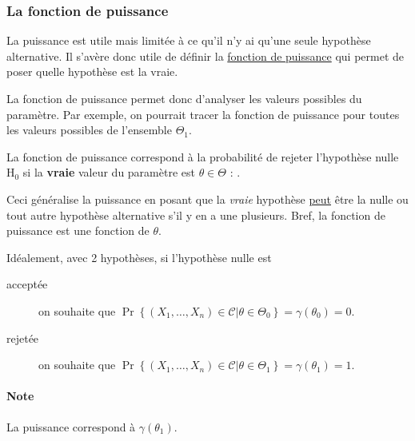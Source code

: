 \documentclass[french]{article}
\begin{document}
\begin{multicols*}{2}
\subsubsection{La fonction de puissance}
\begin{rappel_enhanced}[Contexte]
La puissance est utile mais limitée à ce qu'il n'y ai qu'une seule hypothèse alternative. Il s'avère donc utile de définir la \underline{fonction de puissance} qui permet de poser quelle hypothèse est la vraie.

\bigskip

La fonction de puissance permet donc d'analyser les valeurs possibles du paramètre. Par exemple, on pourrait tracer la fonction de puissance pour toutes les valeurs possibles de l'ensemble $\Theta_{1}$.
\end{rappel_enhanced}

\begin{definitionNOHFILL}
La fonction de puissance correspond à la probabilité de rejeter l'hypothèse nulle $\mathrm{H}_{0}$ si la \textbf{vraie} valeur du paramètre est $\theta \in \Theta$ : . 

\bigskip

Ceci généralise la puissance en posant que la \textit{vraie} hypothèse \underline{peut} être la nulle ou tout autre hypothèse alternative s'il y en a une plusieurs. Bref, la fonction de puissance est une fonction de $\theta$. 

\bigskip

Idéalement, avec 2 hypothèses, si l'hypothèse nulle est 
\begin{description}
	\item[acceptée]	on souhaite que $\Pr\left\{(X_{1}, \dots, X_{n}) \in \mathcal{C} |  \theta \in \Theta_{0}\right\} = \gamma(\theta_{0}) = 0$.
	\item[rejetée]	on souhaite que $\Pr\left\{(X_{1}, \dots, X_{n}) \in \mathcal{C} |  \theta \in \Theta_{1}\right\} = \gamma(\theta_{1}) = 1$.
\end{description}
\end{definitionNOHFILL}

\paragraph{Note}	La puissance correspond à $\gamma(\theta_{1})$.




\end{multicols*}
\end{document}
